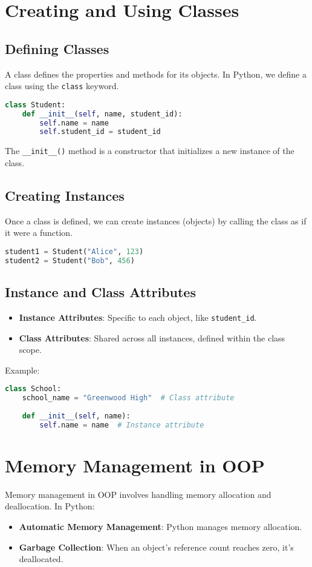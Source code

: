 \documentclass{article}
\begin{document}
\section{Creating and Using Classes}
\subsection{Defining Classes}
A class defines the properties and methods for its objects. In Python, we define a class using the \texttt{class} keyword.
\begin{lstlisting}[language=Python]
class Student:
    def __init__(self, name, student_id):
        self.name = name
        self.student_id = student_id
\end{lstlisting}
The \texttt{\_\_init\_\_()} method is a constructor that initializes a new instance of the class.

\subsection{Creating Instances}
Once a class is defined, we can create instances (objects) by calling the class as if it were a function.
\begin{lstlisting}[language=Python]
student1 = Student("Alice", 123)
student2 = Student("Bob", 456)
\end{lstlisting}

\subsection{Instance and Class Attributes}
\begin{itemize}
    \item \textbf{Instance Attributes}: Specific to each object, like \texttt{student\_id}.
    \item \textbf{Class Attributes}: Shared across all instances, defined within the class scope.
\end{itemize}

Example:
\begin{lstlisting}[language=Python]
class School:
    school_name = "Greenwood High"  # Class attribute
    
    def __init__(self, name):
        self.name = name  # Instance attribute
\end{lstlisting}

\section{Memory Management in OOP}
Memory management in OOP involves handling memory allocation and deallocation. In Python:
\begin{itemize}
    \item \textbf{Automatic Memory Management}: Python manages memory allocation.
    \item \textbf{Garbage Collection}: When an object’s reference count reaches zero, it’s deallocated.
\end{itemize}
\end{document}
